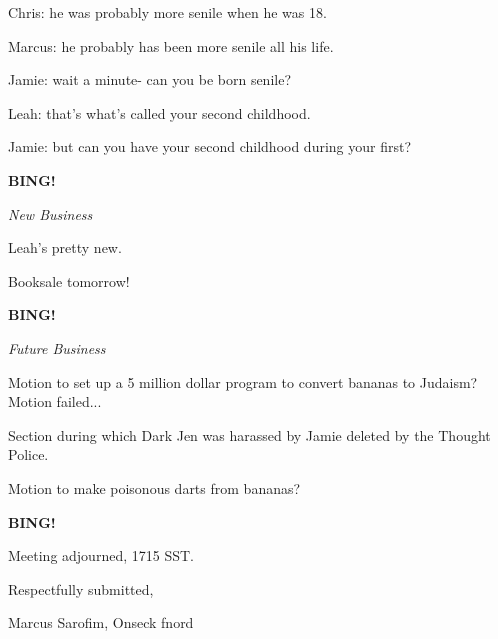 \documentclass[12pt]{article}
\newcommand{\bing}{{\bf BING!} }
\newcommand{\goto}[1]{\bing \vskip 12pt \centerline{{\em{#1}}}}
\begin{document}
Chris: he was probably more senile when he was 18.

Marcus: he probably has been more senile all his life.

Jamie: wait a minute- can you be born senile?

Leah: that's what's called your second childhood.

Jamie: but can you have your second childhood during your first?

\goto{New Business}

Leah's pretty new.

Booksale tomorrow!

\goto{Future Business}

Motion to set up a 5 million dollar program to convert bananas to Judaism? Motion failed...

Section during which Dark Jen was harassed by Jamie deleted by the Thought Police.

Motion to make poisonous darts from bananas?

\bing

\vspace{12pt}

\noindent
Meeting adjourned, 1715 SST.

\vspace{18pt}

\centerline{Respectfully submitted,}
\centerline{Marcus Sarofim, Onseck fnord}
\end{document}
